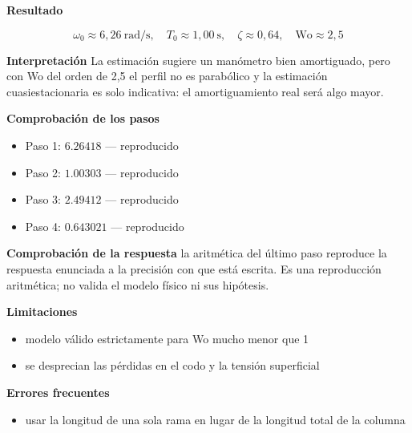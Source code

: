 \documentclass[10pt,openany]{book}
\begin{document}
\begin{tcolorbox}[title={Problema resuelto}, studiumworked, breakable]
\noindent\textbf{Resultado}

\[
\omega_0 \approx 6{,}26\ \mathrm{rad/s},\quad T_0 \approx 1{,}00\ \mathrm{s},\quad \zeta \approx 0{,}64,\quad \mathrm{Wo} \approx 2{,}5
\]

\noindent\textbf{Interpretación}
La estimación sugiere un manómetro bien amortiguado, pero con Wo del orden de 2,5 el perfil no es parabólico y la estimación cuasiestacionaria es solo indicativa: el amortiguamiento real será algo mayor.

\noindent\textbf{Comprobación de los pasos}
\begin{itemize}
\item Paso 1: $6.26418$ — reproducido
\item Paso 2: $1.00303$ — reproducido
\item Paso 3: $2.49412$ — reproducido
\item Paso 4: $0.643021$ — reproducido
\end{itemize}

\noindent\textbf{Comprobación de la respuesta} la aritmética del último paso reproduce la respuesta enunciada a la precisión con que está escrita. Es una reproducción aritmética; no valida el modelo físico ni sus hipótesis.

\noindent\textbf{Limitaciones}
\begin{itemize}
\item modelo válido estrictamente para Wo mucho menor que 1
\item se desprecian las pérdidas en el codo y la tensión superficial
\end{itemize}

\noindent\textbf{Errores frecuentes}
\begin{itemize}
\item usar la longitud de una sola rama en lugar de la longitud total de la columna
\end{itemize}
\end{tcolorbox}
\end{document}
